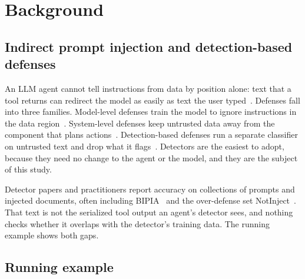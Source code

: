 \section{Background}
\label{sec:background}

\subsection{Indirect prompt injection and detection-based defenses}
An LLM agent cannot tell instructions from data by position alone: text that a tool returns can redirect the model as easily as text the user typed~\cite{greshake2023,liu2024formalizing}. Defenses fall into three families. Model-level defenses train the model to ignore instructions in the data region~\cite{struq,secalign}. System-level defenses keep untrusted data away from the component that plans actions~\cite{camel}. Detection-based defenses run a separate classifier on untrusted text and drop what it flags~\cite{piguard,promptshield,datasentinel,llamafirewall}. Detectors are the easiest to adopt, because they need no change to the agent or the model, and they are the subject of this study.

Detector papers and practitioners report accuracy on collections of prompts and injected documents, often including BIPIA~\cite{bipia} and the over-defense set NotInject~\cite{piguard}. That text is not the serialized tool output an agent's detector sees, and nothing checks whether it overlaps with the detector's training data. The running example shows both gaps.

\subsection{Running example}


